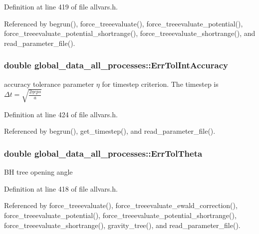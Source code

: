 Definition at line 419 of file allvars.h.



Referenced by begrun(), force\_\-treeevaluate(), force\_\-treeevaluate\_\-potential(), force\_\-treeevaluate\_\-potential\_\-shortrange(), force\_\-treeevaluate\_\-shortrange(), and read\_\-parameter\_\-file().

\hypertarget{structglobal__data__all__processes_a73f3a95e03513c038cf3215a2204bce4}{
\subsubsection[{ErrTolIntAccuracy}]{\setlength{\rightskip}{0pt plus 5cm}double {\bf global\_\-data\_\-all\_\-processes::ErrTolIntAccuracy}}}
\label{structglobal__data__all__processes_a73f3a95e03513c038cf3215a2204bce4}
accuracy tolerance parameter $ \eta $ for timestep criterion. The timestep is $ \Delta t = \sqrt{\frac{2 \eta eps}{a}} $ 

Definition at line 424 of file allvars.h.



Referenced by begrun(), get\_\-timestep(), and read\_\-parameter\_\-file().

\hypertarget{structglobal__data__all__processes_ac3edc89fa5616655618ddccb430e3dfe}{
\subsubsection[{ErrTolTheta}]{\setlength{\rightskip}{0pt plus 5cm}double {\bf global\_\-data\_\-all\_\-processes::ErrTolTheta}}}
\label{structglobal__data__all__processes_ac3edc89fa5616655618ddccb430e3dfe}
BH tree opening angle 

Definition at line 418 of file allvars.h.



Referenced by force\_\-treeevaluate(), force\_\-treeevaluate\_\-ewald\_\-correction(), force\_\-treeevaluate\_\-potential(), force\_\-treeevaluate\_\-potential\_\-shortrange(), force\_\-treeevaluate\_\-shortrange(), gravity\_\-tree(), and read\_\-parameter\_\-file().

